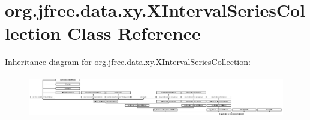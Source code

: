 \hypertarget{classorg_1_1jfree_1_1data_1_1xy_1_1_x_interval_series_collection}{}\section{org.\+jfree.\+data.\+xy.\+X\+Interval\+Series\+Collection Class Reference}
\label{classorg_1_1jfree_1_1data_1_1xy_1_1_x_interval_series_collection}
Inheritance diagram for org.\+jfree.\+data.\+xy.\+X\+Interval\+Series\+Collection\+:\begin{figure}[H]
\begin{center}
\leavevmode
\includegraphics[height=1.846154cm]{classorg_1_1jfree_1_1data_1_1xy_1_1_x_interval_series_collection}
\end{center}
\end{figure}
